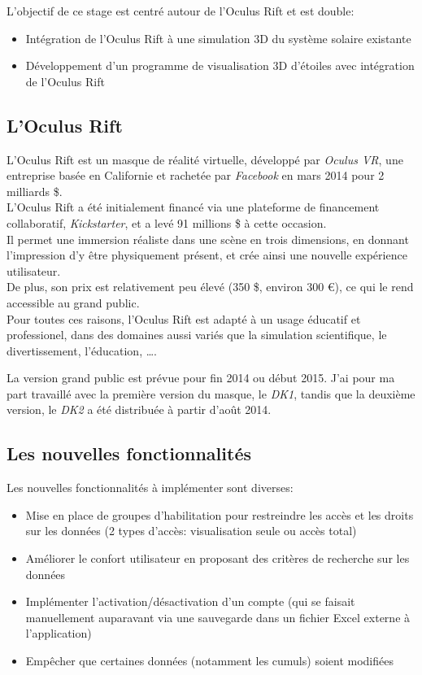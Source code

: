 \documentclass[a4paper,french,8pt]{article}
\begin{document}
		L’objectif de ce stage est centré autour de l'Oculus Rift et est double:
		\begin{itemize}
		 \item Intégration de l'Oculus Rift à une simulation 3D du système solaire existante
		 \item Développement d'un programme de visualisation 3D  d'étoiles avec intégration de l'Oculus Rift
		\end{itemize}

	
	\subsection{L'Oculus Rift}
		
		L'Oculus Rift est un masque de réalité virtuelle, développé par \emph{Oculus VR}, une entreprise 
		basée en Californie et rachetée par \emph{Facebook} en mars 2014 pour  2 milliards \$. \\
		L'Oculus Rift a été initialement financé via une plateforme de financement collaboratif, \emph{Kickstarter},
		et a levé 91 millions \$ à cette occasion. \\
		Il permet une immersion  réaliste dans une scène en trois dimensions, en donnant l'impression d'y être physiquement
		présent, et crée ainsi une nouvelle expérience
		utilisateur. \\
		De plus, son prix est relativement peu élevé (350 \$, environ 300 \euro), ce qui le rend accessible au grand public. \\
		Pour toutes ces raisons, l'Oculus Rift est adapté à un usage éducatif et professionel, dans des domaines aussi variés
		que la simulation scientifique, le divertissement, l'éducation, \ldots.
		
		La version grand public est prévue pour fin 2014 ou début 2015. J'ai pour ma part travaillé avec la première
		version du masque, le \emph{DK1}, tandis que la deuxième version, le \emph{DK2} a été distribuée à partir d'août 2014.
		

	\subsection{Les nouvelles fonctionnalités}
	
		Les nouvelles fonctionnalités à implémenter sont diverses:
		
		\begin{itemize}
			\item Mise en place de groupes d’habilitation pour restreindre les accès et les droits sur les données (2 types d'accès: visualisation seule ou accès total)
			\item Améliorer le confort utilisateur en proposant des critères de recherche sur les données
			\item Implémenter l’activation/désactivation d’un compte (qui se faisait manuellement auparavant via une sauvegarde dans un fichier Excel externe à l'application)
			\item Empêcher que certaines données (notamment les cumuls) soient modifiées
		\end{itemize}
		
\end{document}
